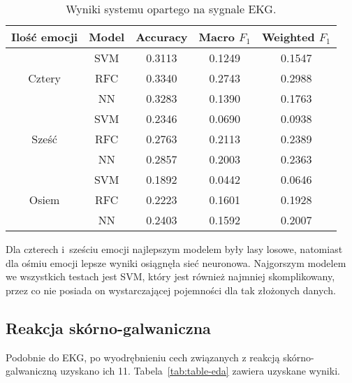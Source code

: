 \begin{table}[h]
    \centering
    \begin{tabular}{||c||c||c|c|c||}
        \hline
        Ilość emocji & Model & Accuracy & Macro \(F_{1}\) & Weighted \(F_{1}\) \\ [0.5ex]
        \hline\hline
        \multirow{3}{4em}{Cztery} & SVM & 0.3113 & 0.1249 & 0.1547 \\
        \cline{2-5}
        & RFC & 0.3340 & 0.2743 & 0.2988 \\
        \cline{2-5}
        & NN & 0.3283 & 0.1390 & 0.1763 \\
        \hline\hline
        \multirow{3}{4em}{Sześć} & SVM & 0.2346 & 0.0690 & 0.0938 \\
        \cline{2-5}
        & RFC & 0.2763 & 0.2113 & 0.2389 \\
        \cline{2-5}
        & NN & 0.2857 & 0.2003 & 0.2363 \\
        \hline\hline
        \multirow{3}{4em}{Osiem} & SVM & 0.1892 & 0.0442 & 0.0646 \\
        \cline{2-5}
        & RFC & 0.2223 & 0.1601 & 0.1928 \\
        \cline{2-5}
        & NN & 0.2403 & 0.1592 & 0.2007 \\
        \hline
    \end{tabular}
    \caption{Wyniki systemu opartego na sygnale EKG.}
    \label{tab:table-ekg}
\end{table}

Dla czterech i~sześciu emocji najlepszym modelem były lasy losowe, natomiast dla ośmiu emocji lepsze wyniki osiągnęła sieć neuronowa.
Najgorszym modelem we wszystkich testach jest SVM, który jest również najmniej skomplikowany, przez co nie posiada on wystarczającej pojemności dla tak złożonych danych.

\subsection{Reakcja skórno-galwaniczna}\label{subsec:reakcja-skorno-galwaniczna}

Podobnie do EKG, po wyodrębnieniu cech związanych z reakcją skórno-galwaniczną uzyskano ich 11.
Tabela~\ref{tab:table-eda} zawiera uzyskane wyniki.

